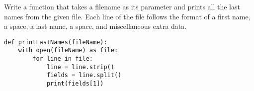 Write a function that takes a filename as its parameter and prints all the last names from the given file. Each line of the file follows the format of a first name, a space, a last name, a space, and miscellaneous extra data. 

\begin{answer}
\begin{lstlisting}
def printLastNames(fileName):
    with open(fileName) as file:
        for line in file:
            line = line.strip()
            fields = line.split()
            print(fields[1])

\end{lstlisting}
\end{answer}
